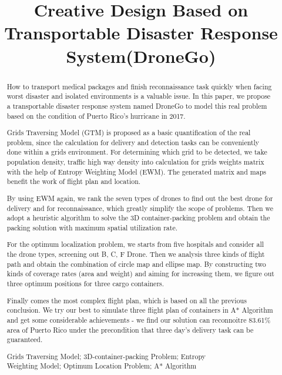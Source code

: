 \documentclass{mcmthesis}
\title{Creative Design Based on Transportable Disaster Response System(DroneGo)}
\begin{document}
\begin{abstract}  
	How to transport medical packages and finish reconnaissance task quickly when facing worst disaster and isolated environments is a valuable issue. In this paper, we propose a transportable disaster response system named DroneGo to model this real problem based on the condition of Puerto Rico's hurricane in 2017. \par
	Grids Traversing Model (GTM) is proposed as a basic quantification of the real problem, since the calculation for delivery and detection tasks can be conveniently done within a grids environment. For determining which grid to be detected, we take population density, traffic high way density into calculation for grids weights matrix with the help of Entropy Weighting Model (EWM). The generated matrix and maps benefit the work of flight plan and location. \par
	By using EWM again, we rank the seven types of drones to find out the best drone for delivery and for reconnaissance, which greatly simplify the scope of problems. Then we adopt a heuristic algorithm to solve the 3D container-packing problem and obtain the packing solution with maximum spatial utilization rate.\par
	For the optimum localization problem, we starts from five hospitals and consider all the drone types, screening out B, C, F Drone. Then we analysis three kinds of flight path and obtain the combination of circle map and ellipse map. By constructing two kinds of coverage rates (area and weight) and aiming for increasing them, we figure out three optimum positions for three cargo containers.    \par
	Finally comes the most complex flight plan, which is based on all the previous conclusion. We try our best to simulate three flight plan of containers in A* Algorithm and get some considerable achievements - we find our solution can reconnoitre 83.61\% area of Puerto Rico under the  precondition that three day's delivery task can be guaranteed. 
	
	\begin{keywords}
	Grids Traversing Model; 3D-container-packing Problem; Entropy  \\ \enspace\enspace\indent\enspace\enspace\indent\enspace\enspace\indent\enspace\enspace\enspace   Weighting Model;  Optimum Location Problem; A* Algorithm  
	
	\end{keywords}
\end{abstract}
    \maketitle                             
\end{document}
